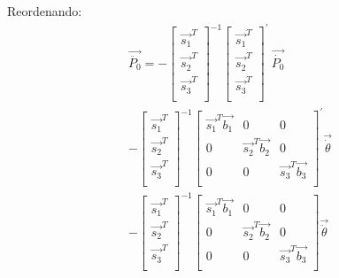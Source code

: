         Reordenando:
        \begin{multline*}
         \overrightarrow{\ddot{P_{0}}}=- \left[ \begin{matrix}
        \overrightarrow{s_{1}}^{T}\\
        \overrightarrow{s_{2}}^{T}\\
        \overrightarrow{s_{3}}^{T}\\
        \end{matrix}
         \right] ^{-1} \left[ \begin{matrix}
        \overrightarrow{s_{1}}^{T}\\
        \overrightarrow{s_{2}}^{T}\\
        \overrightarrow{s_{3}}^{T}\\
        \end{matrix}
         \right] ^{'}~\overrightarrow{\dot{P_{0}}}\\- \left[ \begin{matrix}
        \overrightarrow{s_{1}}^{T}\\
        \overrightarrow{s_{2}}^{T}\\
        \overrightarrow{s_{3}}^{T}\\
        \end{matrix}
         \right] ^{-1} \left[ \begin{matrix}
        \overrightarrow{s_{1}}^{T}\overrightarrow{b_{1}}  &  0  &  0\\
        0  &  \overrightarrow{s_{2}}^{T}\overrightarrow{b_{2}}  &  0\\
        0  &  0  &  \overrightarrow{s_{3}}^{T}\overrightarrow{b_{3}}\\
        \end{matrix}
         \right] ^{'}\overrightarrow{\dot{ \theta }}\\- \left[ \begin{matrix}
        \overrightarrow{s_{1}}^{T}\\
        \overrightarrow{s_{2}}^{T}\\
        \overrightarrow{s_{3}}^{T}\\
        \end{matrix}
         \right] ^{-1} \left[ \begin{matrix}
        \overrightarrow{s_{1}}^{T}\overrightarrow{b_{1}}  &  0  &  0\\
        0  &  \overrightarrow{s_{2}}^{T}\overrightarrow{b_{2}}  &  0\\
        0  &  0  &  \overrightarrow{s_{3}}^{T}\overrightarrow{b_{3}}\\
        \end{matrix}
         \right] \overrightarrow{\ddot{ \theta }}~ 
        \end{multline*}


